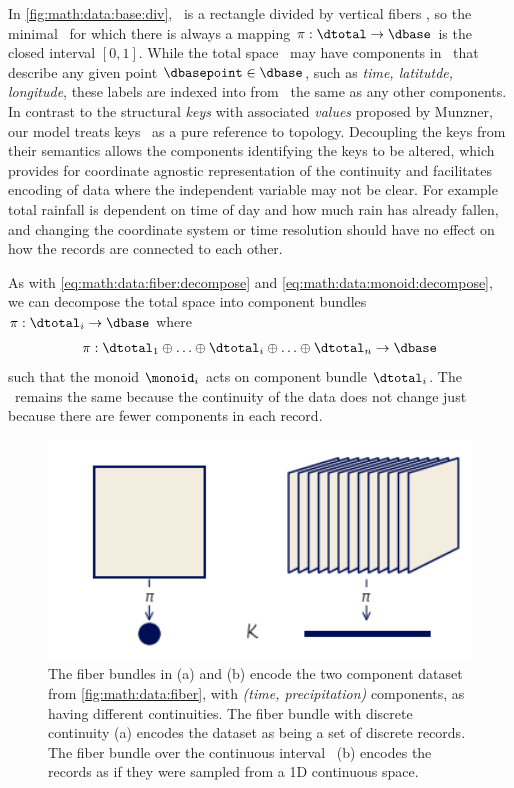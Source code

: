 \documentclass[../main.tex]{subfiles}
\begin{document}
In \autoref{fig:math:data:base:div}, \dtotal\ is a rectangle divided by vertical fibers \dfiber, so the minimal \dbase\ for which there is always a mapping $\pi: \dtotal\rightarrow \dbase$ is the closed interval $\left[0,1\right]$. While the total space \dtotal\ may have components in \dfiber\ that describe any given point $\dbasepoint \in \dbase$, such as \textit{time, latitutde, longitude}, these labels are indexed into from \dbase\ the same as any other components. In contrast to the structural \textit{keys} with associated \textit{values} proposed by Munzner\cite{munznerVisualizationAnalysisDesign2014}, our model treats keys \dbasepoint\ as a pure reference to topology. Decoupling the keys from their semantics allows the components identifying the keys to be altered, which provides for coordinate agnostic representation of the continuity and facilitates encoding of data where the independent variable may not be clear. For example total rainfall is dependent on time of day and how much rain has already fallen, and changing the coordinate system or time resolution should have no effect on how the records are connected to each other. 

As with \autoref{eq:math:data:fiber:decompose} and \autoref{eq:math:data:monoid:decompose}, we can decompose the total space into component bundles $\pi:\dtotal_i\rightarrow \dbase$ where
\begin{equation}
    \label{eq:math:data:base:decompose}
    \pi:\dtotal_1\oplus\ldots\oplus \dtotal_i \oplus\ldots \oplus \dtotal_n \rightarrow \dbase
\end{equation}
such that the monoid \(\monoid_{i}\) acts on component bundle \(\dtotal_i\). The \dbase\ remains the same because the continuity of the data does not change just because there are fewer components in each record.

\begin{figure}[H]
    \includegraphics[width=1\textwidth]{figures/math/base.png}
    \caption{The fiber bundles in (a) and (b) encode the two component dataset from \autoref{fig:math:data:fiber}, with \textit{(time, precipitation)} components, as having different continuities. The fiber bundle with discrete continuity (a) encodes the dataset as being a set of discrete records. The fiber bundle over the continuous interval \dbase\ (b) encodes the records as if they were sampled from a 1D continuous space.} 
    \label{fig:math:data:base}
\end{figure}
\end{document}
